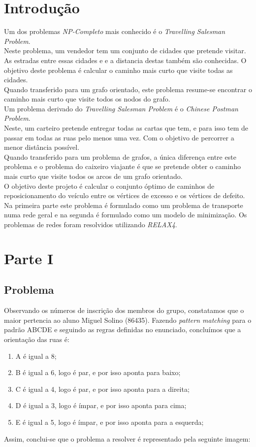 \documentclass[a4paper]{report}
\begin{document}
\chapter{Introdução}
Um dos problemas \textit{NP-Completo} mais conhecido é o \textit{Travelling
Salesman Problem}. \\
Neste problema, um vendedor tem um conjunto de cidades que pretende visitar. As
estradas entre essas cidades e e a distancia destas também são conhecidas. O
objetivo deste problema é calcular o caminho mais curto que visite todas as
cidades.\\
Quando transferido para um grafo orientado, este problema resume-se
encontrar o caminho mais curto que visite todos os nodos do grafo.\\
Um problema derivado do \textit{Travelling Salesman Problem} é o \textit{Chinese
Postman Problem}.\\
Neste, um carteiro pretende entregar todas as cartas que tem, e para isso tem de
passar em todas as ruas pelo menos uma vez. Com o objetivo de percorrer a menor
distância possível.\\
Quando transferido para um problema de grafos, a única diferença entre este
problema e o problema do caixeiro viajante é que se pretende obter o caminho
mais curto que visite todos os arcos de um grafo orientado. \\
O objetivo deste projeto é calcular o conjunto óptimo de caminhos de reposicionamento
do veículo entre os vértices de excesso e os vértices de defeito. Na primeira
parte este problema é formulado como um problema de transporte numa rede geral e
na segunda é formulado como um modelo de minimização.
Os problemas de redes foram resolvidos utilizando \textit{RELAX4}.

\chapter{Parte I}
\section{Problema}
Observando os números de inscrição dos membros do grupo, constatamos
que o maior pertencia ao aluno Miguel Solino (86435).
Fazendo \textit{pattern matching} para o padrão ABCDE e seguindo as
regras definidas no enunciado, concluímos que a orientação das ruas é:

\begin{enumerate}
    \item A é igual a 8;
    \item B é igual a 6, logo é par, e por isso aponta para baixo;
    \item C é igual a 4, logo é par, e por isso aponta para a direita;
    \item D é igual a 3, logo é ímpar, e por isso aponta para cima;
    \item E é igual a 5, logo é ímpar, e por isso aponta para a 
        esquerda;
\end{enumerate}
Assim, conclui-se que o problema a resolver é representado pela
seguinte imagem:
\end{document}
